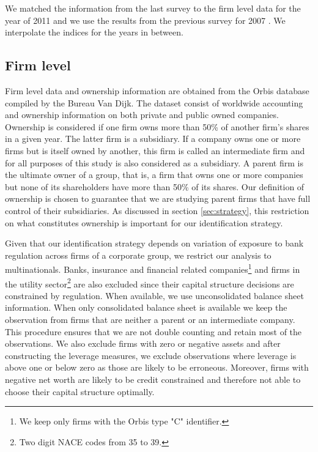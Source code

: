 \documentclass[12pt]{article}
\begin{document}
	  We matched the information from the last survey to the firm level data for the year of 2011 and we use the results from the previous survey for 2007 \citep{barth2008bank}. We interpolate the indices for the years in between.  	
	  	
 	\subsection{Firm level} \label{subsec:firm}
	Firm level data and ownership information are obtained from the Orbis database compiled by the Bureau Van Dijk. The dataset consist of worldwide accounting and ownership information on both private and public owned companies.  Ownership is considered if one firm owns more than 50\% of another firm's shares in a given year. The latter firm is a subsidiary. If a company owns one or more firms but is itself owned by another, this firm is called an intermediate firm and for all purposes of this study is also considered as a subsidiary. A parent firm is the ultimate owner of a group, that is, a firm that owns one or more companies but none of its shareholders have more than 50\% of its shares. Our definition of ownership is chosen to guarantee that we are studying parent firms that have full control of their subsidiaries. As discussed in section \ref{sec:strategy}, this restriction on what constitutes ownership is important for our identification strategy.
	
	Given that our identification strategy depends on variation of exposure to bank regulation across firms of a corporate group, we restrict our analysis to multinationals. Banks, insurance and financial related companies\footnote{We keep only firms with the Orbis type "C" identifier.} and firms in the utility sector\footnote{Two digit NACE codes from 35 to 39.} are also excluded since their capital structure decisions are constrained by regulation. When available, we use unconsolidated balance sheet information. When only consolidated balance sheet is available we keep the observation from firms that are neither a parent or an intermediate company. This procedure ensures that we are not double counting and retain most of the observations. We also exclude firms with zero or negative assets and after constructing the leverage measures, we exclude observations where leverage is above one or below zero as those are likely to be erroneous. Moreover, firms with negative net worth are likely to be credit constrained and therefore not able to choose their capital structure optimally.
	
\end{document}
